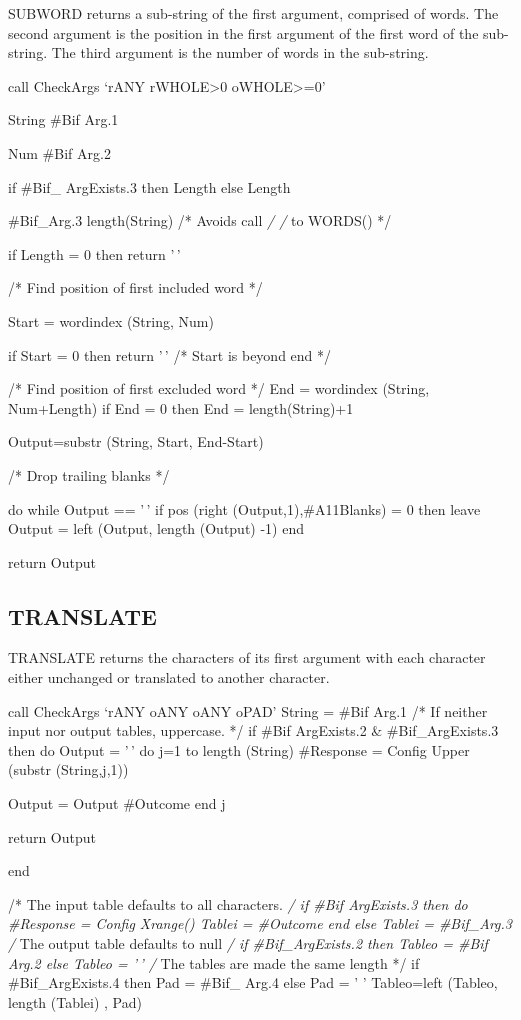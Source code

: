SUBWORD returns a sub-string of the first argument, comprised of words.
The second argument is the position in the first argument of the first
word of the sub-string. The third argument is the number of words in the
sub-string.

call CheckArgs `rANY rWHOLE\textgreater0 oWHOLE\textgreater=0'

String \#Bif Arg.1

Num \#Bif Arg.2

if \#Bif\_ ArgExists.3 then Length else Length

\#Bif\_Arg.3 length(String) /* Avoids call \emph{/ /} to WORDS() */

if Length = 0 then return '\,'

/* Find position of first included word */

Start = wordindex (String, Num)

if Start = 0 then return '\,' /* Start is beyond end */

/* Find position of first excluded word */ End = wordindex (String,
Num+Length) if End = 0 then End = length(String)+1

Output=substr (String, Start, End-Start)

/* Drop trailing blanks */

do while Output == '\,' if pos (right (Output,1),\#A11Blanks) = 0 then
leave Output = left (Output, length (Output) -1) end

return Output

\hypertarget{translate}{%
\subsection{TRANSLATE}\label{translate}}

TRANSLATE returns the characters of its first argument with each
character either unchanged or translated to another character.

call CheckArgs `rANY oANY oANY oPAD' String = \#Bif Arg.1 /* If neither
input nor output tables, uppercase. */ if \#Bif ArgExists.2 \&
\#Bif\_ArgExists.3 then do Output = '\,' do j=1 to length (String)
\#Response = Config Upper (substr (String,j,1))

Output = Output \textbar\textbar{} \#Outcome end j

return Output

end

/* The input table defaults to all characters. \emph{/ if \#Bif
ArgExists.3 then do \#Response = Config Xrange() Tablei = \#Outcome end
else Tablei = \#Bif\_Arg.3 /} The output table defaults to null \emph{/
if \#Bif\_ArgExists.2 then Tableo = \#Bif Arg.2 else Tableo = '\,' /}
The tables are made the same length */ if \#Bif\_ArgExists.4 then Pad =
\#Bif\_ Arg.4 else Pad = ' ' Tableo=left (Tableo, length (Tablei) , Pad)

